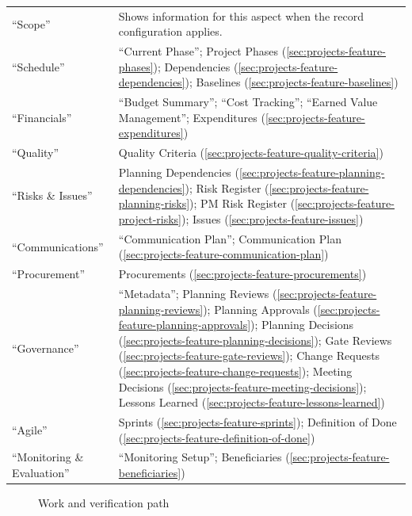 \begin{table}[H]
\begin{tabularx}{\linewidth}{R{4.2cm} Y}
“Scope” & Shows information for this aspect when the record configuration applies.\\
“Schedule” & “Current Phase”; Project Phases (\ref{sec:projects-feature-phases}); Dependencies (\ref{sec:projects-feature-dependencies}); Baselines (\ref{sec:projects-feature-baselines})\\
“Financials” & “Budget Summary”; “Cost Tracking”; “Earned Value Management”; Expenditures (\ref{sec:projects-feature-expenditures})\\
“Quality” & Quality Criteria (\ref{sec:projects-feature-quality-criteria})\\
“Risks \& Issues” & Planning Dependencies (\ref{sec:projects-feature-planning-dependencies}); Risk Register (\ref{sec:projects-feature-planning-risks}); PM Risk Register (\ref{sec:projects-feature-project-risks}); Issues (\ref{sec:projects-feature-issues})\\
“Communications” & “Communication Plan”; Communication Plan (\ref{sec:projects-feature-communication-plan})\\
“Procurement” & Procurements (\ref{sec:projects-feature-procurements})\\
“Governance” & “Metadata”; Planning Reviews (\ref{sec:projects-feature-planning-reviews}); Planning Approvals (\ref{sec:projects-feature-planning-approvals}); Planning Decisions (\ref{sec:projects-feature-planning-decisions}); Gate Reviews (\ref{sec:projects-feature-gate-reviews}); Change Requests (\ref{sec:projects-feature-change-requests}); Meeting Decisions (\ref{sec:projects-feature-meeting-decisions}); Lessons Learned (\ref{sec:projects-feature-lessons-learned})\\
“Agile” & Sprints (\ref{sec:projects-feature-sprints}); Definition of Done (\ref{sec:projects-feature-definition-of-done})\\
“Monitoring \& Evaluation” & “Monitoring Setup”; Beneficiaries (\ref{sec:projects-feature-beneficiaries})\\
\end{tabularx}
\end{table}
\begin{figure}[H]
\centering
{}
\rclegend
\caption{Work and verification path}
\label{fig:projects-projects-flow}
\end{figure}

